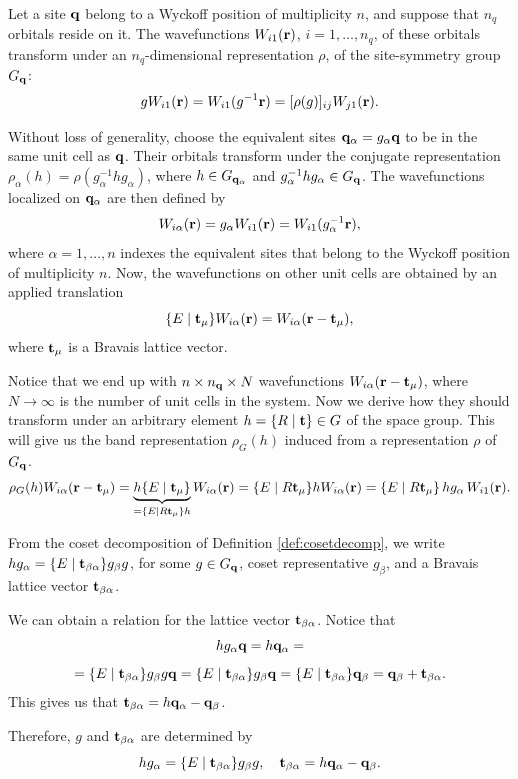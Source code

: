 Let a site ${\vb{q}}$ belong to a Wyckoff position of multiplicity $n$, and suppose that $n_q$ orbitals reside on it. The wavefunctions $W_{i1}({\vb{r}})$, $i = 1, \ldots, n_q$, of these orbitals transform under an $n_q$-dimensional representation $\rho$, of the site-symmetry group $G_{\vb{q}}$:
$$
g W_{i1}({\vb{r}}) = W_{i1}(g^{-1} {\vb{r}}) = [\rho(g)]_{ij} W_{j1}({\vb{r}}).
$$

Without loss of generality, choose the equivalent sites ${\vb{q}}_\alpha = g_{\alpha} {\vb{q}}$ to be in the same unit cell as ${\vb{q}}$. Their orbitals transform under the conjugate representation $\rho_\alpha(h) = \rho(g_\alpha^{-1} h g_\alpha)$, where $h \in G_{{\vb{q}}_\alpha}$ and $g_\alpha^{-1} h g_\alpha \in G_{\vb{q}}$. The wavefunctions localized on ${\vb{q}}_\alpha$ are then defined by
$$
W_{i\alpha}({\vb{r}}) = g_\alpha W_{i1}({\vb{r}}) = W_{i1}(g_\alpha^{-1} {\vb{r}}),
$$
where $\alpha = 1, \ldots, n$ indexes the equivalent sites that belong to the Wyckoff position of multiplicity $n$. Now, the wavefunctions on other unit cells are obtained by an applied translation
$$
\{ E \mid {\vb{t}}_\mu \} W_{i\alpha}({\vb{r}}) = W_{i\alpha}({\vb{r}}-{\vb{t}}_\mu),
$$
where ${\vb{t}}_\mu$ is a Bravais lattice vector.

Notice that we end up with $n \times n_{\vb{q}} \times N$ wavefunctions $W_{i\alpha}({\vb{r}}-{\vb{t}}_\mu)$, where $N \to \infty$ is the number of unit cells in the system. Now we derive how they should transform under an arbitrary element $h = \{ R \mid {\vb{t}} \} \in G$ of the space group. This will give us the band representation $\rho_G(h)$ induced from a representation $\rho$ of $G_{\vb{q}}$.
$$
\rho_G(h) W_{i\alpha}({\vb{r}}-{\vb{t}}_\mu) =
\underbrace{h \{ E \mid {\vb{t}}_\mu \}}_{= \{ E \mid R{\vb{t}}_\mu \} h} W_{i\alpha} ({\vb{r}}) =
\{ E \mid R{\vb{t}}_\mu \} h W_{i\alpha} ({\vb{r}}) =
\{ E \mid R{\vb{t}}_\mu \} \, h g_\alpha \, W_{i1} ({\vb{r}}).
$$

From the coset decomposition of Definition \ref{def:cosetdecomp}, we write $h g_\alpha = \{ E \mid {\vb{t}}_{\beta\alpha} \} g_\beta g$, for some $g \in G_{\vb{q}}$, coset representative $g_\beta$, and a Bravais lattice vector ${\vb{t}}_{\beta\alpha}$.

We can obtain a relation for the lattice vector ${\vb{t}}_{\beta\alpha}$. Notice that
$$
h g_\alpha {\vb{q}} = h {\vb{q}}_\alpha =
$$
$$
= \{ E \mid {\vb{t}}_{\beta\alpha} \} g_\beta g {\vb{q}} = \{ E \mid {\vb{t}}_{\beta\alpha} \} g_\beta {\vb{q}} = \{ E \mid {\vb{t}}_{\beta\alpha} \} {\vb{q}}_\beta = {\vb{q}}_\beta + {\vb{t}}_{\beta\alpha}.
$$
This gives us that ${\vb{t}}_{\beta\alpha} = h {\vb{q}}_\alpha - {\vb{q}}_\beta$.

Therefore, $g$ and ${\vb{t}}_{\beta\alpha}$ are determined by
\begin{equation} \label{eq:g_and_tba}
h g_\alpha = \{ E \mid {\vb{t}}_{\beta\alpha} \} g_\beta g, \quad {\vb{t}}_{\beta\alpha} = h {\vb{q}}_\alpha - {\vb{q}}_\beta.
\end{equation}


